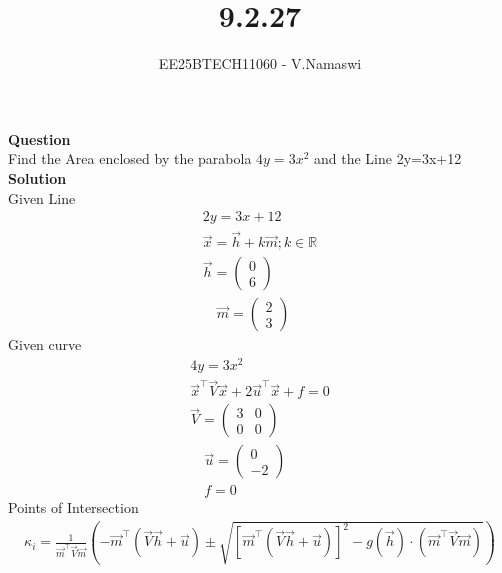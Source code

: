 \documentclass[journal]{IEEEtran}
\begin{document}

\vspace{3cm}

\title{9.2.27}
\author{EE25BTECH11060 - V.Namaswi}
{\let\newpage\relax\maketitle}
\renewcommand{\thefigure}{\theenumi}
\renewcommand{\thetable}{\theenumi}
\setlength{\intextsep}{10pt} %
\textbf{Question}\\Find the Area enclosed by the parabola $4y=3x^2$ and the Line 2y=3x+12\\
\textbf{Solution}\\
Given Line 
\begin{align}
2y=3x+12\\
\vec{x}=\vec{h}+k\vec{m} ; k \in \mathbb{R}\\
\vec{h} = \begin{pmatrix} 0 \\ 6 \end{pmatrix}\\ \quad 
\vec{m} = \begin{pmatrix} 2 \\ 3 \end{pmatrix}
\end{align}
Given curve
\begin{align}
    4y=3 x^2\\
    \vec{x}^\top \vec{V} \vec{x} + 2\vec{u}^\top \vec{x} + f = 0\\
    \vec{V} = \begin{pmatrix} 3 & 0 \\ 0 & 0 \end{pmatrix}\\ \quad
\vec{u} = \begin{pmatrix} 0 \\ -2 \end{pmatrix} \\ \quad
f = 0
\end{align}
Points of Intersection\\
\begin{align}
    \kappa_i = \frac{1}{\vec{m}^\top \vec{V} \vec{m}} 
\left( -\vec{m}^\top (\vec{V}\vec{h} + \vec{u}) 
\pm \sqrt{ \left[ \vec{m}^\top (\vec{V}\vec{h} + \vec{u}) \right]^2 
- g(\vec{h}) \cdot (\vec{m}^\top \vec{V} \vec{m}) } \right)
\end{align}
\end{document}
